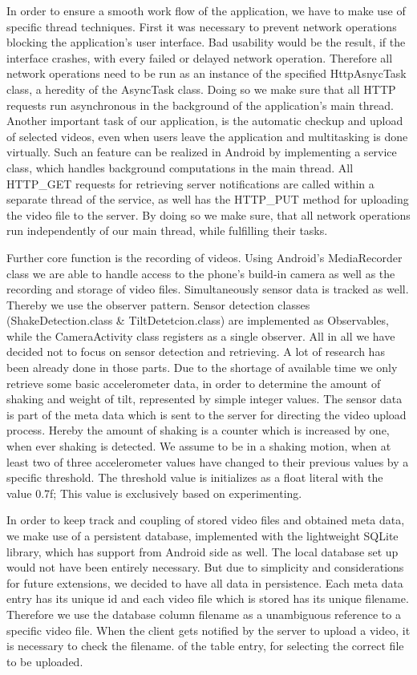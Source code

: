 \documentclass[conference]{IEEEtran}
\begin{document}
In order to ensure a smooth work flow of the application, we have to make use of specific thread techniques.
First it was necessary to prevent network operations blocking the application's user interface. Bad usability would be the result, if the interface crashes, with every failed or delayed network operation. Therefore all network operations need to be run as an instance of the specified HttpAsnycTask class, a heredity of the AsyncTask class. Doing so we make sure that all HTTP requests run asynchronous in the background of the application's main thread.
Another important task of our application, is the automatic checkup and upload of selected videos, even when users leave the application and multitasking is done virtually. Such an feature can be realized in Android by implementing a service class, which handles background computations in the main thread. All HTTP\_GET requests for retrieving server notifications are called within a separate thread of the service, as well has the HTTP\_PUT method for uploading the video file to the server. By doing so we make sure, that all network operations run independently of our main thread, while fulfilling their tasks.

Further core function is the recording of videos. Using Android's MediaRecorder class we are able to handle access to the phone's build-in camera as well as the recording and storage of video files.
Simultaneously sensor data is tracked as well. Thereby we use the observer pattern. Sensor detection classes (ShakeDetection.class & TiltDetetcion.class) are implemented as Observables, while the CameraActivity class registers as a single observer. All in all we have decided not to focus on sensor detection and retrieving. A lot of research has been already done in those parts. Due to the shortage of available time we only retrieve some basic accelerometer data, in order to determine the amount of shaking and weight of tilt, represented by simple integer values. The sensor data is part of the meta data which is sent to the server for directing the video upload process. Hereby the amount of shaking is a counter which is increased by one, when ever shaking is detected. We assume to be in a shaking motion, when at least two of three accelerometer values have changed to their previous values by a specific threshold. The threshold value is initializes as a float literal with the value 0.7f; This value is exclusively based on experimenting.

In order to keep track and coupling of stored video files and obtained meta data, we make use of a persistent database, implemented with the lightweight SQLite library, which has support from Android side as well. The local database set up would not have been entirely necessary. But due to simplicity and considerations for future extensions, we decided to have all data in persistence.
Each meta data entry has its unique id and each video file which is stored has its unique filename. Therefore we use the database column filename as a unambiguous reference to a specific video file. When the client gets notified by the server to upload a video, it is necessary to check the filename. of the table entry, for selecting the correct file to be uploaded.
\end{document}
